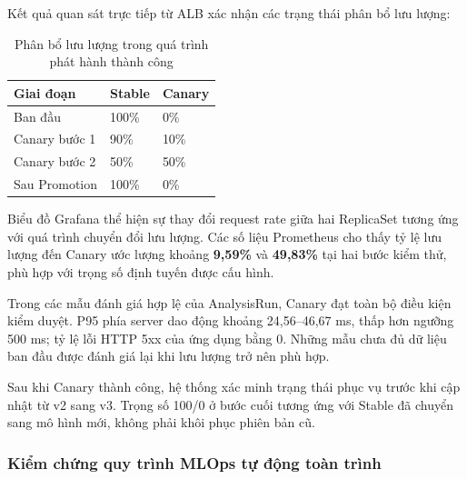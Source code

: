 Kết quả quan sát trực tiếp từ ALB xác nhận các trạng thái phân bổ lưu lượng:


\begin{table}[!htbp]\centering
\fontsize{12}{15}\selectfont{}
\setlength{\tabcolsep}{4pt}\setlength{\arrayrulewidth}{0.4pt}\renewcommand{\arraystretch}{1.2}
\setlength{\ReportTableWidth}{\dimexpr\linewidth-4\arrayrulewidth\relax}
\begin{tabular}{|L{\tabcolsep\relax}|L{\tabcolsep\relax}|L{\tabcolsep\relax}|}
\hline
\textbf{Giai đoạn} & \textbf{Stable} & \textbf{Canary} \\
\hline
Ban đầu & 100\% & 0\% \\\hline
Canary bước 1 & 90\% & 10\% \\\hline
Canary bước 2 & 50\% & 50\% \\\hline
Sau Promotion & 100\% & 0\% \\\hline
\end{tabular}
\caption{Phân bổ lưu lượng trong quá trình phát hành thành công}\label{tab:16}
\end{table}

Biểu đồ Grafana thể hiện sự thay đổi request rate giữa hai ReplicaSet tương ứng với quá trình chuyển đổi lưu lượng. Các số liệu Prometheus cho thấy tỷ lệ lưu lượng đến Canary ước lượng khoảng \textbf{9,59\%} và \textbf{49,83\%} tại hai bước kiểm thử, phù hợp với trọng số định tuyến được cấu hình.


Trong các mẫu đánh giá hợp lệ của AnalysisRun, Canary đạt toàn bộ điều kiện kiểm duyệt. P95 phía server dao động khoảng 24,56–46,67 ms, thấp hơn ngưỡng 500 ms; tỷ lệ lỗi HTTP 5xx của ứng dụng bằng 0. Những mẫu chưa đủ dữ liệu ban đầu được đánh giá lại khi lưu lượng trở nên phù hợp.


Sau khi Canary thành công, hệ thống xác minh trạng thái phục vụ trước khi cập nhật  từ v2 sang v3. Trọng số 100/0 ở bước cuối tương ứng với Stable đã chuyển sang mô hình mới, không phải khôi phục phiên bản cũ.


\FloatBarrier

\subsubsection{Kiểm chứng quy trình MLOps tự động toàn trình}


